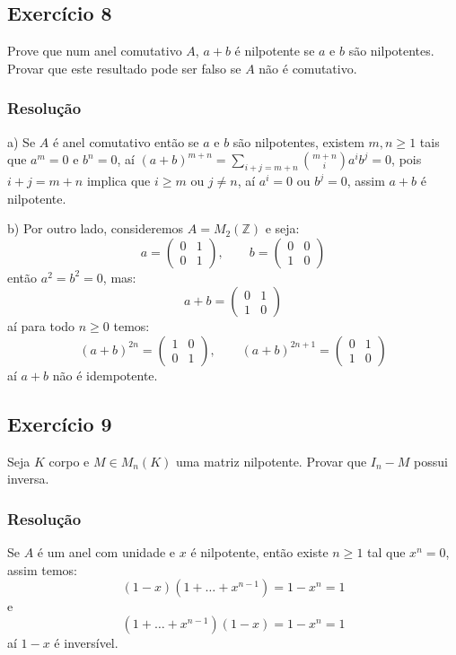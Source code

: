\documentclass[10pt,a4paper]{article}
\begin{document}
\subsection*{Exercício 8}
Prove que num anel comutativo $A$, $a+b$ é nilpotente se $a$ e $b$ são nilpotentes. Provar que este resultado pode ser falso se $A$ não é comutativo.

\subsubsection*{Resolução}

a) Se $A$ é anel comutativo então se $a$ e $b$ são nilpotentes, existem $m,n\geq 1$ tais que $a^m=0$ e $b^n=0$, aí $(a+b)^{m+n}=\sum_{i+j=m+n}\binom{m+n}{i}a^ib^j=0$, pois $i+j=m+n$ implica que $i\geq m$ ou $j\neq n$, aí $a^i=0$ ou $b^j=0$, assim $a+b$ é nilpotente.

\medskip
\noindent
b) Por outro lado, consideremos $A=M_2(\mathbb{Z})$ e seja:
\[
a=\begin{pmatrix}
0&1\\0&1
\end{pmatrix},\quad\quad
b=\begin{pmatrix}
0&0\\1&0
\end{pmatrix}
\]
então $a^2=b^2=0$, mas:
\[
a+b=\begin{pmatrix}
0&1\\1&0
\end{pmatrix}
\]
aí para todo $n\geq 0$ temos:
\[
(a+b)^{2n}=\begin{pmatrix}
1&0\\0&1
\end{pmatrix},\quad\quad
(a+b)^{2n+1}=\begin{pmatrix}
0&1\\1&0
\end{pmatrix}
\]
aí $a+b$ não é idempotente.

\newpage

\subsection*{Exercício 9}
Seja $K$ corpo e $M\in M_n(K)$ uma matriz nilpotente. Provar que $I_n-M$ possui inversa.

\subsubsection*{Resolução}

Se $A$ é um anel com unidade e $x$ é nilpotente, então existe $n\geq 1$ tal que $x^n=0$, assim temos:
\[
(1-x)(1+\dots+x^{n-1})=1-x^n=1
\]
e
\[
(1+\dots+x^{n-1})(1-x)=1-x^n=1
\]
aí $1-x$ é inversível.
\end{document}
